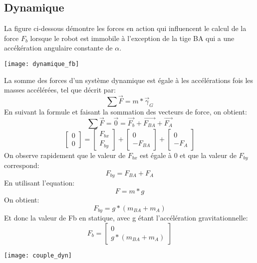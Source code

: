 \documentclass{udes_rapport} %
\begin{document}
\subsection{Dynamique}
La figure ci-dessous démontre les forces en action qui influencent le calcul de la force $F_b$ lorsque le robot est immobile à l'exception de la tige BA qui a une accékération angulaire constante de $\alpha$.
\begin{center}
	\centering
	\texttt{[image: dynamique\_fb]}
	\label{statique_fb}
\end{center}
La somme des forces d'un système dynamique est égale à les accélérations fois les masses accélérées, tel que décrit par:
\begin{equation}
	\sum \overrightarrow F = m*\overrightarrow \gamma_G
\end{equation}
En suivant la formule et faisant la sommation des vecteurs de force, on obtient:
	\[	\sum \overrightarrow F = \overrightarrow 0 = \overrightarrow{F_b} + \overrightarrow{F_{BA}} + \overrightarrow{F_A}	\]
	\[	\begin{bmatrix}
	0\\ 
	0
	\end{bmatrix} = \begin{bmatrix}
	F_{bx}\\ 
	F_{by}
	\end{bmatrix} + \begin{bmatrix}
	0\\ 
	-F_{BA}
	\end{bmatrix} + \begin{bmatrix}
	0\\ 
	-F_A
	\end{bmatrix}	\]
On observe rapidement que le valeur de $F_{bx}$ est égale à 0 et que la valeur de $F_{by}$ correspond:
	\[	F_{by} = F_{BA} + F_A 	\]
En utilisant l'equation:
\begin{equation}
	F = m*g
\end{equation}
On obtient:
	\[	F_{by} = g*(m_{BA} + m_A)	\]
Et donc la valeur de Fb en statique, avec g étant l'accélération gravitationnelle:
	\[	F_b = \begin{bmatrix}
	0\\ 
	g*(m_{BA} + m_A)
	\end{bmatrix}	\]
\begin{center}
	\centering
	\texttt{[image: couple\_dyn]}
	\label{couple_dynamique}
\end{center}
\end{document}

